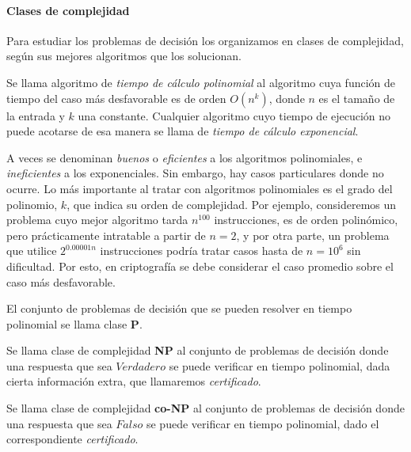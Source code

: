 \hfil 

\paragraph{Clases de complejidad}

\hfil

Para estudiar los problemas de decisión los organizamos en clases de complejidad, según sus mejores algoritmos que los solucionan.


\begin{definition}
	Se llama algoritmo de \textit{tiempo de cálculo polinomial} al algoritmo cuya función de tiempo del caso más desfavorable es de orden $O(n^k)$, donde $n$ es el tamaño de la entrada y $k$ una constante. Cualquier algoritmo cuyo tiempo de ejecución no puede acotarse de esa manera se llama de \textit{tiempo de cálculo exponencial}.
\end{definition}

A veces se denominan \textit{buenos} o \textit{eficientes} a los algoritmos polinomiales, e \textit{ineficientes} a los exponenciales. Sin embargo, hay casos particulares donde no ocurre. Lo más importante al tratar con algoritmos polinomiales es el grado del polinomio, $k$, que indica su orden de complejidad. Por ejemplo, consideremos un problema cuyo mejor algoritmo tarda $n^{100}$ instrucciones, es de orden polinómico, pero prácticamente intratable a partir de $n=2$, y por otra parte, un problema que utilice $2^{0.00001n}$ instrucciones podría tratar casos hasta de $n=10^6$ sin dificultad.
Por esto, en criptografía se debe considerar el caso promedio sobre el caso más desfavorable.


\begin{definition}
	El conjunto de problemas de decisión que se pueden resolver en tiempo polinomial se llama clase \textbf{P}.
\end{definition}

\begin{definition}
	\label{def:NP}
	Se llama clase de complejidad \textbf{NP} al conjunto de problemas de decisión donde una respuesta que sea $Verdadero$ se puede verificar en tiempo polinomial, dada cierta información extra, que llamaremos \textit{certificado}.
\end{definition}

\begin{definition}
	Se llama clase de complejidad \textbf{co-NP} al conjunto de problemas de decisión donde una respuesta que sea $Falso$ se puede verificar en tiempo polinomial, dado el correspondiente \textit{certificado}.
\end{definition}

